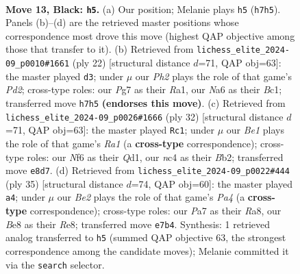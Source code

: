 \documentclass[11pt]{article}
\begin{document}
\begin{figure}[p]
\label{fig:thought-m23}
\end{figure}

\clearpage

\begin{figure}[p]\centering
\begin{subfigure}{0.46\textwidth}\centering
\resizebox{\linewidth}{!}{%
\newchessgame
\chessboard[
  setfen={r2rb1k1/ppq1bppp/n1p1pn2/8/P1NP1P2/1P4P1/4P1BP/RNBQR1K1 b - - 0 13},
  showmover=false,
  pgfstyle=straightmove, color=movearrow, markmove={h7-h5}
]}
\caption{}
\end{subfigure}\hfill
\begin{subfigure}{0.46\textwidth}\centering
\resizebox{\linewidth}{!}{%
\newchessgame
\chessboard[
  setfen={r1bqr1k1/pp3pbp/2n3p1/2pnp3/8/2P2N1P/PPNP1PP1/R1BQRBK1 w - - 0 12},
  showmover=false,
  pgfstyle=straightmove, color=movearrow, markmove={d2-d3}
]}
\caption{}
\end{subfigure}
\\[4pt]
\begin{subfigure}{0.46\textwidth}\centering
\resizebox{\linewidth}{!}{%
\newchessgame
\chessboard[
  setfen={rnbq1rk1/p3p1bp/1pp3p1/4Pp2/3P4/1PNNP3/PB3RPP/R2Q2K1 w - f6 0 17},
  showmover=false,
  pgfstyle=straightmove, color=movearrow, markmove={a1-c1}
]}
\caption{}
\end{subfigure}\hfill
\begin{subfigure}{0.46\textwidth}\centering
\resizebox{\linewidth}{!}{%
\newchessgame
\chessboard[
  setfen={r3r1k1/4qppp/2p2n2/p2p4/1b3P2/2pPP3/P1P1Q1PP/RNB1R1K1 b - - 2 18},
  showmover=false,
  pgfstyle=straightmove, color=movearrow, markmove={a5-a4}
]}
\caption{}
\end{subfigure}
\caption{\textbf{Move 13, Black: \texttt{h5}.} (a) Our position; Melanie plays \texttt{h5} (\texttt{h7h5}). Panels (b)--(d) are the retrieved master positions whose correspondence most drove this move (highest QAP objective among those that transfer to it). (b) Retrieved from \texttt{lichess\_elite\_2024-09\_p0010\#1661} (ply 22) [structural distance $d$=71, QAP obj=63]: the master played \texttt{d3}; under $\mu$ our \emph{Ph2} plays the role of that game's \emph{Pd2}; cross-type roles: our \emph{P}g7 as their \emph{R}a1, our \emph{N}a6 as their \emph{B}c1; transferred move \texttt{h7h5} \textbf{(endorses this move)}. (c) Retrieved from \texttt{lichess\_elite\_2024-09\_p0026\#1666} (ply 32) [structural distance $d$=71, QAP obj=63]: the master played \texttt{Rc1}; under $\mu$ our \emph{Be1} plays the role of that game's \emph{Ra1} (a \textbf{cross-type} correspondence); cross-type roles: our \emph{N}f6 as their \emph{Q}d1, our \emph{n}c4 as their \emph{B}b2; transferred move \texttt{e8d7}. (d) Retrieved from \texttt{lichess\_elite\_2024-09\_p0022\#444} (ply 35) [structural distance $d$=74, QAP obj=60]: the master played \texttt{a4}; under $\mu$ our \emph{Be2} plays the role of that game's \emph{Pa4} (a \textbf{cross-type} correspondence); cross-type roles: our \emph{P}a7 as their \emph{R}a8, our \emph{B}e8 as their \emph{R}e8; transferred move \texttt{e7b4}. Synthesis: 1 retrieved analog transferred to \texttt{h5} (summed QAP objective 63, the strongest correspondence among the candidate moves); Melanie committed it via the \texttt{search} selector.}

\end{figure}
\end{document}
